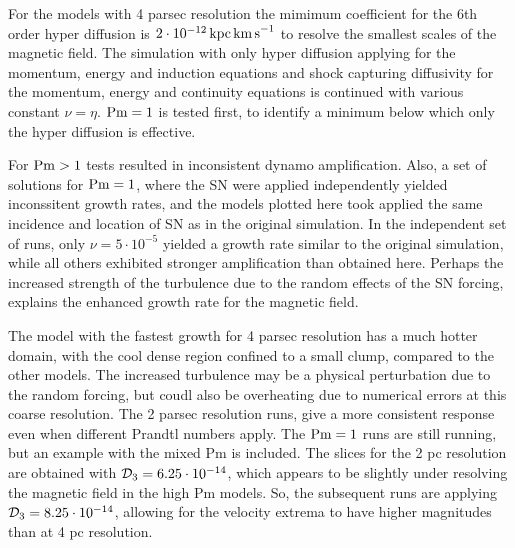\documentclass[iop,apj,numberedappendix,twocolappendix]{emulateapj}
\begin{document}


For the models with 4 parsec resolution the mimimum coefficient for the 
6th order hyper diffusion is $2\cdot10^{-12}\,{\rm kpc\,km\,s}^{-1}$ to
resolve the smallest scales of the magnetic field.
The simulation with only hyper diffusion applying for the momentum, energy and
induction equations and shock capturing diffusivity for the momentum, energy and
continuity equations is continued with various constant $\nu=\eta$.
${\rm Pm}=1$ is tested first, to identify a minimum below which only the
hyper diffusion is effective.

For ${\rm Pm}>1$ tests resulted in inconsistent dynamo amplification.
Also, a set of solutions for ${\rm Pm}=1$, where the SN were applied 
independently yielded inconssitent growth rates, and the models plotted here
took applied the same incidence and location of SN as in the original 
simulation.
In the independent set of runs, only $\nu=5\cdot10^{-5}$ yielded a growth rate
similar to the original simulation, while all others exhibited stronger
amplification than obtained here.
Perhaps the increased strength of the turbulence due to the random effects of
the SN forcing, explains the enhanced growth rate for the magnetic field.

The model with the fastest growth for 4 parsec resolution has a much hotter 
domain, with the cool dense region confined to a small clump, compared to the
other models.
The increased turbulence may be a physical perturbation due to the random 
forcing, but coudl also be overheating due to numerical errors at this coarse
resolution. 
The 2 parsec resolution runs, give a more consistent response even when 
different Prandtl numbers apply.
The ${\rm Pm}=1$ runs are still running, but an example with the mixed Pm is
included.
The slices for the 2 pc resolution are obtained with ${\cal D}_3=6.25\cdot
10^{-14}$, which appears to be slightly under resolving the magnetic
field in the high Pm models. So, the subsequent
runs are applying ${\cal D}_3=8.25\cdot
10^{-14}$, allowing for the velocity extrema to have higher magnitudes
than at 4 pc
resolution.
\end{document}
